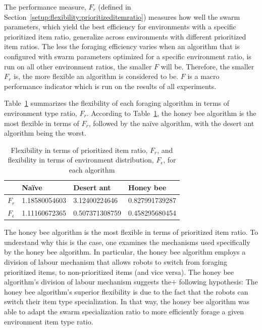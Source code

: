 The performance measure, $F_r$ (defined in Section~\ref{setup:flexibility:prioritizeditemratio}) measures how well the swarm parameters, which yield the best efficiency for environments with a specific prioritized item ratio, generalize across environments with different prioritized item ratios. The less the foraging efficiency varies when an algorithm that is configured with swarm parameters optimized for a specific environment ratio, is run on all other environment ratios, the smaller $F$ will be. Therefore, the smaller $F_r$ is, the more flexible an algorithm is considered to be. $F$ is a macro performance indicator which is run on the results of all experiments. 

Table~\ref{table:flexibility} summarizes the flexibility of each foraging algorithm in terms of environment type ratio, $F_r$. According to Table~\ref{table:flexibility}, the honey bee algorithm is the most flexible in terms of $F_r$, followed by the na\"ive algorithm, with the desert ant algorithm being the worst. 

 
\begin{table}[]
\centering
\caption{Flexibility in terms of prioritized item ratio, $F_r$, and flexibility in terms of environment distribution, $F_\epsilon$, for each algorithm}
\label{table:flexibility}
\begin{tabular}{@{}llll@{}}
\toprule
\textbf{}         & Na\"ive         & Desert ant        & Honey bee         \\ \midrule
\textbf{$F_r$}    & 1.18580054603 & 3.12400224646     & 0.827991739287    \\ \midrule
\textbf{$F_\epsilon$} & 1.11160672365 & 0.507371308759 & 0.458295680454 
\end{tabular}
\end{table}

The honey bee algorithm is the most flexible in terms of prioritized item ratio. To understand why this is the case, one examines the mechanisms used specifically by the honey bee algorithm. In particular, the honey bee algorithm employs a division of labour mechanism that allows robots to switch from foraging prioritized items, to non-prioritized items (and vice versa). The honey bee algorithm's division of labour mechanism suggests the+ following hypothesis: The honey bee algorithm's superior flexibility is due to the fact that the robots can switch their item type specialization. In that way, the honey bee algorithm was able to adapt the swarm specialization ratio to more efficiently forage a given environment item type ratio.

